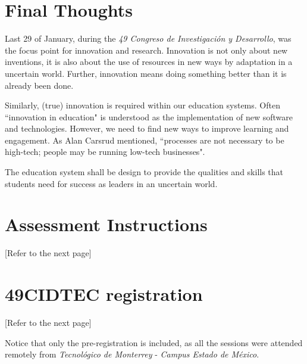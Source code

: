 \documentclass[11pt,a4paper]{article}
\begin{document}
\clearpage

\section{Final Thoughts}\label{sec:final}
Last 29 of January, during the \emph{49 Congreso de Investigación y Desarrollo}, was the focus point for innovation and research. Innovation is not only about new inventions, it is also about the use of resources in new ways by adaptation in a uncertain world. Further, innovation means doing something better than it is already been done.

Similarly, (true) innovation is required within our education systems. Often ``innovation in education" is understood as the implementation of new software and technologies. However, we need to find new ways to improve learning and engagement. As Alan Carsrud mentioned, ``processes are not necessary to be high-tech; people may be running low-tech businesses".

The education system shall be design to provide the qualities and skills that students need for success as leaders in an uncertain world.


\clearpage
\printbibliography

\appendix %

\section{Assessment Instructions}\label{sec:instructions}
[Refer to the next page]



\section{49CIDTEC registration}\label{sec:registration}
[Refer to the next page]

Notice that only the pre-registration is included, as all the sessions were attended remotely from \emph{Tecnológico de Monterrey} - \emph{Campus Estado de México}.



\end{document}
